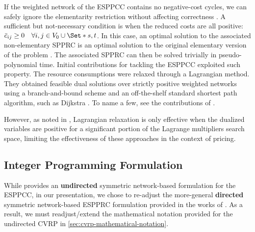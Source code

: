 If the weighted network of the ESPPCC contains no negative-cost cycles, we can safely ignore the elementarity restriction without affecting correctness \parencite{beasley1989}.
A sufficient but not-necessary condition is when the reduced costs are all positive: $\bar{c}_{ij} \ge 0 \quad \forall i, j \in V_0 \cup \Set*{s, t}$.
In this case, an optimal solution to the associated non-elementary SPPRC is an optimal solution to the original elementary version of the problem \parencite{beasley1989}.
The associated SPPRC can then be solved trivially in pseudo-polynomial time.
Initial contributions for tackling the ESPPCC exploited such property.
The resource consumptions were relaxed through a Lagrangian method.
They obtained feasible dual solutions over strictly positive weighted networks using a branch-and-bound scheme and an off-the-shelf standard shortest path algorithm, such as Dijkstra \parencite{sniedovich2006dijkstra}.
To name a few, see the contributions of \textcite{beasley1989, dumitrescu2003improved, carlyle2008, muhandiramge2009simultaneous}.

However, as noted in \textcite{righini2004}, Lagrangian relaxation is only effective when the dualized variables are positive for a significant portion of the Lagrange multipliers search space, limiting the effectiveness of these approaches in the context of pricing.

\subsection{Integer Programming Formulation}
\label{sec:espprc-integer-programming-formulation}

While \textcite{jepsen2008branchandcut} provides
an \textbf{undirected} symmetric network-based formulation for the ESPPCC,
in our presentation, we chose to re-adjust the more-general
\textbf{directed} symmetric network-based ESPPRC formulation
provided in the works of \textcite{beasley1989, toth2002, toth2014}.
As a result, we must readjust/extend the mathematical notation
provided for the undirected CVRP in \cref{sec:cvrp-mathematical-notation}.

\medskip

